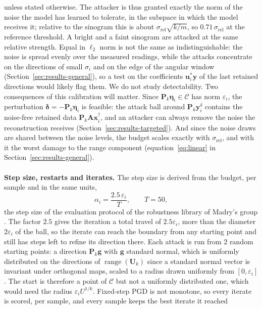 \documentclass{article}
\numberwithin{equation}{section}
\begin{document}
unless stated otherwise. The attacker is thus granted exactly the norm of the noise the model has learned to
tolerate, in the subspace in which the model receives it; relative to the sinogram this is about
$\sigma_\text{rel}\sqrt{k/m}$, so $0.71\,\sigma_\text{rel}$ at the reference threshold. A bright and a faint
sinogram are attacked at the same relative strength. Equal in $\ell_2$ norm is not the same as
indistinguishable: the noise is spread evenly over the measured readings, while the attacks concentrate on
the directions of small $\sigma_i$ and on the edge of the angular window (Section~\ref{sec:results-general}),
so a test on the coefficients $\mathbf{u}_i^{*}\mathbf{y}$ of the last retained directions would likely flag
them. We do not study detectability. Two consequences of this calibration will matter. Since
$\mathbf{P}_k\boldsymbol{\eta}_i\in\mathcal{C}$ has norm $\varepsilon_i$, the perturbation
$\boldsymbol{\delta}=-\mathbf{P}_k\boldsymbol{\eta}_i$ is feasible: the attack ball around
$\mathbf{P}_k\mathbf{y}^\delta_i$ contains the noise-free retained data $\mathbf{P}_k\mathbf{A}\mathbf{x}^\dagger_i$,
and an attacker can always remove the noise the reconstruction receives (Section~\ref{sec:results-targeted}).
And since the noise draws are shared between the noise levels, the budget scales exactly with
$\sigma_\text{rel}$, and with it the worst damage to the range component (equation~\eqref{eq:linear} in
Section~\ref{sec:results-general}).\\\\
\textbf{Step size, restarts and iterates.} The step size is derived from the budget, per sample and in
the same units,
\[\alpha_i = \frac{2.5\,\varepsilon_i}{T},\qquad T=50,\]
the step size of the evaluation protocol of the robustness library of Madry's group \parencite{robustness}.
The factor $2.5$ gives the iteration a total travel of $2.5\varepsilon_i$, more than the diameter
$2\varepsilon_i$ of the ball, so the iterate can reach the boundary from any starting point and still has
steps left to refine its direction there. Each attack is run from $2$ random starting points: a direction
$\mathbf{P}_k\mathbf{g}$ with $\mathbf{g}$ standard normal, which is uniformly distributed on the directions
of $\operatorname{range}(\mathbf{U}_k)$ since a standard normal vector is invariant under orthogonal maps,
scaled to a radius drawn uniformly from $[0,\varepsilon_i]$. The start is therefore a point of $\mathcal{C}$
but not a uniformly distributed one, which would need the radius $\varepsilon_iU^{1/k}$. Fixed-step PGD is
not monotone, so every iterate is scored, per sample, and every sample keeps the best iterate it reached
\end{document}
